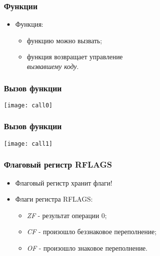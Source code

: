 \begin{frame}
\frametitle{Функции}
\begin{itemize}
    \item<1-> Функция:
    \begin{itemize}
        \item<2->функцию можно вызвать;
        \item<3->функция возвращает управление\\ \emph{вызвавшему коду}.
    \end{itemize}
\end{itemize}
\end{frame}

\begin{frame}
\frametitle{Вызов функции}
    \hspace*{\fill}
    \texttt{[image: call0]}
    \hspace*{\fill}\hspace*{\fill}
\end{frame}

\begin{frame}
\frametitle{Вызов функции}
    \hspace*{\fill}
    \texttt{[image: call1]}
    \hspace*{\fill}\hspace*{\fill}
\end{frame}

\begin{frame}
\frametitle{Флаговый регистр RFLAGS}
\begin{itemize}
    \item<1-> Флаговый регистр хранит флаги!
    \item<2-> Флаги регистра RFLAGS:
    \begin{itemize}
        \item \emph{ZF} - результат операции 0;
        \item \emph{CF} - произошло беззнаковое переполнение;
        \item \emph{OF} - произошло знаковое переполнение.
    \end{itemize}
\end{itemize}
\end{frame}

